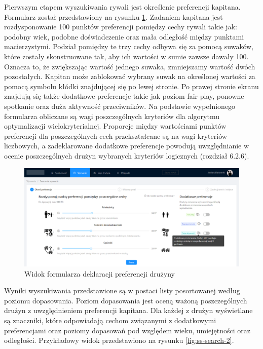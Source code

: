 Pierwszym etapem wyszukiwania rywali jest określenie preferencji kapitana. Formularz został przedstawiony na rysunku \ref{fig:ss-search-1}. Zadaniem kapitana jest rozdysponowanie 100 punktów preferencji pomiędzy cechy rywali takie jak: podobny wiek, podobne doświadczenie oraz mała odległość między punktami macierzystymi. Podział pomiędzy te trzy cechy odbywa się za pomocą suwaków, które zostały skonstruowane tak, aby ich wartości w sumie zawsze dawały 100. Oznacza to, że zwiększając wartość jednego suwaka, zmniejszamy wartość dwóch pozostałych. Kapitan może zablokować wybrany suwak na określonej wartości za pomocą symbolu kłódki znajdującej się po lewej stronie. Po prawej stronie ekranu znajdują się także dodatkowe preferencje takie jak poziom fair-play, ponowne spotkanie oraz duża aktywność przeciwników. Na podstawie wypełnionego formularza obliczane są wagi poszczególnych kryteriów dla algorytmu optymalizacji wielokryterialnej. Proporcje między wartościami punktów preferencji dla poszczególnych cech przekształcane są na wagi kryteriów liczbowych, a zadeklarowane dodatkowe preferencje powodują uwzględnianie w ocenie poszczególnych drużyn wybranych kryteriów logicznych (rozdział 6.2.6). 




\begin{figure}[H]
\centering
\includegraphics[width=\linewidth]{065-dzialanie/rys/ss-search-1.PNG}
\caption{Widok formularza deklaracji preferencji drużyny}
\label{fig:ss-search-1}
\end{figure}

Wyniki wyszukiwania przedstawione są w postaci listy posortowanej według poziomu dopasowania. Poziom dopasowania jest oceną ważoną poszczególnych drużyn z uwzględnieniem preferencji kapitana. Dla każdej z drużyn wyświetlane są znaczniki, które odpowiadają cechom związanymi z dodatkowymi preferencjami oraz poziomy dopasowań pod względem wieku, umiejętności oraz odległości. Przykładowy widok przedstawiono na rysunku \ref{fig:ss-search-2}.    


